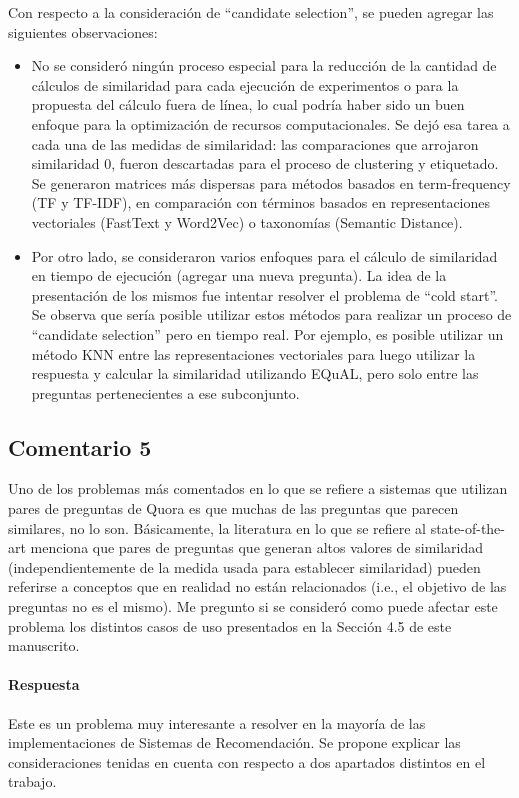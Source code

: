 \bigskip

Con respecto a la consideración de ``candidate selection'', se pueden agregar las siguientes observaciones:
\begin{itemize}
	\item No se consideró ningún proceso especial para la reducción de la cantidad de cálculos de similaridad para cada ejecución de experimentos o para la propuesta del cálculo fuera de línea, lo cual podría haber sido un buen enfoque para la optimización de recursos computacionales. Se dejó esa tarea a cada una de las medidas de similaridad: las comparaciones que arrojaron similaridad 0, fueron descartadas para el proceso de clustering y etiquetado. Se generaron matrices más dispersas para métodos basados en term-frequency (TF y TF-IDF), en comparación con términos basados en representaciones vectoriales (FastText y Word2Vec) o taxonomías (Semantic Distance).
	\item Por otro lado, se consideraron varios enfoques para el cálculo de similaridad en tiempo de ejecución (agregar una nueva pregunta). La idea de la presentación de los mismos fue intentar resolver el problema de ``cold start''. Se observa que sería posible utilizar estos métodos para realizar un proceso de ``candidate selection'' pero en tiempo real. Por ejemplo, es posible utilizar un método KNN entre las representaciones vectoriales para luego utilizar la respuesta y calcular la similaridad utilizando EQuAL, pero solo entre las preguntas pertenecientes a ese subconjunto.
\end{itemize}

\subsection*{Comentario 5}
Uno de los problemas más comentados en lo que se refiere a sistemas que utilizan pares de preguntas de Quora es que muchas de las preguntas que parecen similares, no lo son. Básicamente, la literatura en lo que se refiere al state-of-the-art menciona que pares de preguntas que generan altos valores de similaridad (independientemente de la medida usada para establecer similaridad) pueden referirse a conceptos que en realidad no están relacionados (i.e., el objetivo de las preguntas no es el mismo). Me pregunto si se consideró como puede afectar este problema los distintos casos de uso presentados en la Sección 4.5 de este manuscrito.

\paragraph*{Respuesta}
Este es un problema muy interesante a resolver en la mayoría de las implementaciones de Sistemas de Recomendación. Se propone explicar las consideraciones tenidas en cuenta con respecto a dos apartados distintos en el trabajo.
\bigskip

